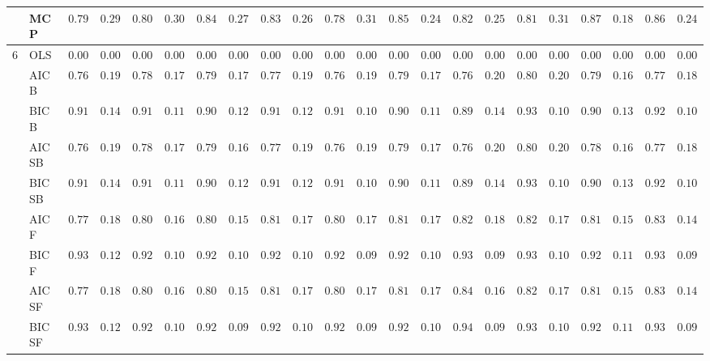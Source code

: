\begin{tabular}{ll|ll|llllll|llllll|llllll}
 & MCP  & $0.7967$ & $0.2955$ & $0.8033$ & $0.3009$ & $0.8483$ & $0.2733$ & $0.8333$ & $0.2638$ & $0.7800$ & $0.3186$ & $0.8500$ & $0.2445$ & $0.8217$ & $0.2587$ & $0.8117$ & $0.3131$ & $0.8750$ & $0.1886$ & $0.8600$ & $0.2436$ \\\hline
6 & OLS  & $0.0000$ & $0.0000$ & $0.0000$ & $0.0000$ & $0.0000$ & $0.0000$ & $0.0000$ & $0.0000$ & $0.0000$ & $0.0000$ & $0.0000$ & $0.0000$ & $0.0000$ & $0.0000$ & $0.0000$ & $0.0000$ & $0.0000$ & $0.0000$ & $0.0000$ & $0.0000$ \\
 & AIC B  & $0.7600$ & $0.1929$ & $0.7867$ & $0.1710$ & $0.7967$ & $0.1701$ & $0.7767$ & $0.1942$ & $0.7683$ & $0.1923$ & $0.7933$ & $0.1710$ & $0.7683$ & $0.2064$ & $0.8000$ & $0.2010$ & $0.7917$ & $0.1681$ & $0.7767$ & $0.1838$ \\
 & BIC B  & $0.9133$ & $0.1450$ & $0.9183$ & $0.1124$ & $0.9033$ & $0.1258$ & $0.9100$ & $0.1285$ & $0.9183$ & $0.1019$ & $0.9083$ & $0.1193$ & $0.8900$ & $0.1445$ & $0.9317$ & $0.1062$ & $0.9017$ & $0.1300$ & $0.9233$ & $0.1070$ \\
 & AIC SB  & $0.7600$ & $0.1929$ & $0.7850$ & $0.1713$ & $0.7950$ & $0.1689$ & $0.7767$ & $0.1942$ & $0.7683$ & $0.1923$ & $0.7933$ & $0.1710$ & $0.7683$ & $0.2064$ & $0.8000$ & $0.2010$ & $0.7867$ & $0.1660$ & $0.7767$ & $0.1838$ \\
 & BIC SB  & $0.9133$ & $0.1450$ & $0.9167$ & $0.1124$ & $0.9033$ & $0.1258$ & $0.9100$ & $0.1285$ & $0.9183$ & $0.1019$ & $0.9083$ & $0.1193$ & $0.8900$ & $0.1445$ & $0.9317$ & $0.1062$ & $0.9017$ & $0.1300$ & $0.9217$ & $0.1071$ \\
 & AIC F  & $0.7783$ & $0.1836$ & $0.8000$ & $0.1675$ & $0.8067$ & $0.1512$ & $0.8133$ & $0.1761$ & $0.8000$ & $0.1741$ & $0.8100$ & $0.1741$ & $0.8283$ & $0.1827$ & $0.8200$ & $0.1752$ & $0.8100$ & $0.1554$ & $0.8317$ & $0.1451$ \\
 & BIC F  & $0.9333$ & $0.1231$ & $0.9233$ & $0.1017$ & $0.9200$ & $0.1018$ & $0.9250$ & $0.1095$ & $0.9250$ & $0.0987$ & $0.9233$ & $0.1044$ & $0.9383$ & $0.0967$ & $0.9350$ & $0.1030$ & $0.9233$ & $0.1122$ & $0.9333$ & $0.0977$ \\
 & AIC SF  & $0.7783$ & $0.1836$ & $0.8000$ & $0.1675$ & $0.8067$ & $0.1512$ & $0.8133$ & $0.1761$ & $0.8017$ & $0.1703$ & $0.8117$ & $0.1703$ & $0.8483$ & $0.1677$ & $0.8200$ & $0.1752$ & $0.8100$ & $0.1554$ & $0.8333$ & $0.1441$ \\
 & BIC SF  & $0.9333$ & $0.1231$ & $0.9233$ & $0.1017$ & $0.9217$ & $0.0990$ & $0.9250$ & $0.1095$ & $0.9250$ & $0.0987$ & $0.9233$ & $0.1044$ & $0.9417$ & $0.0959$ & $0.9350$ & $0.1030$ & $0.9250$ & $0.1121$ & $0.9333$ & $0.0977$ \\

\end{tabular}
